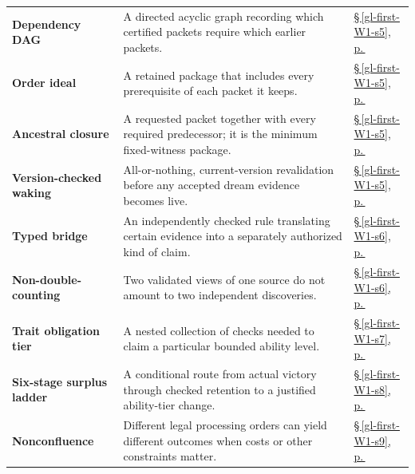 \documentclass[11pt,letterpaper]{article}
\begin{document}
\begin{longtable}{@{}>{\raggedright\arraybackslash}p{.215\linewidth}>{\raggedright\arraybackslash}p{.585\linewidth}>{\raggedright\arraybackslash}p{.14\linewidth}@{}}
\textbf{Dependency DAG} & A directed acyclic graph recording which certified packets require which earlier packets. & \hyperref[gl-first-W1-s5]{\S\,\ref*{gl-first-W1-s5}, p.\,\pageref*{gl-first-W1-s5}} \\
\textbf{Order ideal} & A retained package that includes every prerequisite of each packet it keeps. & \hyperref[gl-first-W1-s5]{\S\,\ref*{gl-first-W1-s5}, p.\,\pageref*{gl-first-W1-s5}} \\
\textbf{Ancestral closure} & A requested packet together with every required predecessor; it is the minimum fixed-witness package. & \hyperref[gl-first-W1-s5]{\S\,\ref*{gl-first-W1-s5}, p.\,\pageref*{gl-first-W1-s5}} \\
\textbf{Version-checked waking} & All-or-nothing, current-version revalidation before any accepted dream evidence becomes live. & \hyperref[gl-first-W1-s5]{\S\,\ref*{gl-first-W1-s5}, p.\,\pageref*{gl-first-W1-s5}} \\
\textbf{Typed bridge} & An independently checked rule translating certain evidence into a separately authorized kind of claim. & \hyperref[gl-first-W1-s6]{\S\,\ref*{gl-first-W1-s6}, p.\,\pageref*{gl-first-W1-s6}} \\
\textbf{Non-double-counting} & Two validated views of one source do not amount to two independent discoveries. & \hyperref[gl-first-W1-s6]{\S\,\ref*{gl-first-W1-s6}, p.\,\pageref*{gl-first-W1-s6}} \\
\textbf{Trait obligation tier} & A nested collection of checks needed to claim a particular bounded ability level. & \hyperref[gl-first-W1-s7]{\S\,\ref*{gl-first-W1-s7}, p.\,\pageref*{gl-first-W1-s7}} \\
\textbf{Six-stage surplus ladder} & A conditional route from actual victory through checked retention to a justified ability-tier change. & \hyperref[gl-first-W1-s8]{\S\,\ref*{gl-first-W1-s8}, p.\,\pageref*{gl-first-W1-s8}} \\
\textbf{Nonconfluence} & Different legal processing orders can yield different outcomes when costs or other constraints matter. & \hyperref[gl-first-W1-s9]{\S\,\ref*{gl-first-W1-s9}, p.\,\pageref*{gl-first-W1-s9}} \\
\end{longtable}\endgroup
\end{document}
